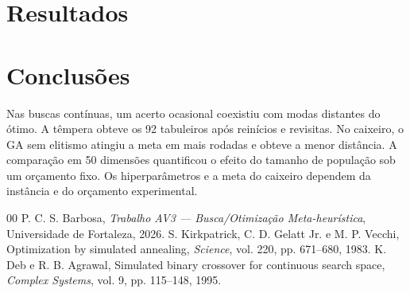 \documentclass[conference,a4paper]{IEEEtran}
\begin{document}
\section{Resultados}

\section{Conclusões}
Nas buscas contínuas, um acerto ocasional coexistiu com modas distantes do ótimo. A têmpera obteve os 92 tabuleiros após reinícios e revisitas. No caixeiro, o GA sem elitismo atingiu a meta em mais rodadas e obteve a menor distância. A comparação em 50 dimensões quantificou o efeito do tamanho de população sob um orçamento fixo. Os hiperparâmetros e a meta do caixeiro dependem da instância e do orçamento experimental.
\begin{thebibliography}{00}
 P. C. S. Barbosa, \emph{Trabalho AV3 --- Busca/Otimização Meta-heurística}, Universidade de Fortaleza, 2026.
 S. Kirkpatrick, C. D. Gelatt Jr. e M. P. Vecchi, Optimization by simulated annealing, \emph{Science}, vol. 220, pp. 671--680, 1983.
 K. Deb e R. B. Agrawal, Simulated binary crossover for continuous search space, \emph{Complex Systems}, vol. 9, pp. 115--148, 1995.
\end{thebibliography}
\end{document}
